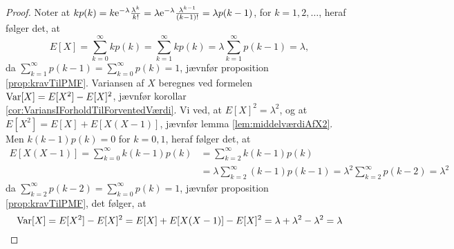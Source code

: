 \begin{proof}
Noter at $kp(k) = k \mathrm{e}^{-\lambda} \frac{\lambda^k}{k!} = \lambda \mathrm{e}^{-\lambda} \frac{\lambda^{k - 1}}{(k - 1)!} = \lambda p(k - 1)$, for $k = 1, 2, \ldots$, heraf følger det, at 
\begin{equation*}
    E[X] = \sum^\infty_{k = 0} k p(k) = \sum^\infty_{k = 1} k p(k) = \lambda \sum^\infty_{k = 1} p(k - 1) = \lambda,
\end{equation*}
da $\sum^\infty_{k = 1} p(k - 1) = \sum^\infty_{k = 0} p(k) =  1$, jævnfør proposition \ref{prop:kravTilPMF}.
Variansen af $X$ beregnes ved formelen $\textnormal{Var}[X] = E[X^2] - E[X]^2$, jævnfør korollar \ref{cor:VariansIForholdTilForventedVærdi}. Vi ved, at $E[X]^2 = \lambda^2$, og at $E[X^2] = E[X] + E[X(X - 1)]$, jævnfør lemma \ref{lem:middelværdiAfX2}. Men $k(k - 1)p(k) = 0$ for $k = 0, 1$, heraf følger det, at
\begin{align*}
    E[X(X-1)] = \sum^{\infty}_{k = 0} k (k - 1) p(k)
    &= \sum^\infty_{k = 2} k(k - 1) p(k) \\ &=  \lambda\sum^\infty_{k = 2} (k - 1) p(k - 1) =\lambda^2 \sum^\infty_{k = 2} p(k - 2) = \lambda^2
\end{align*}
da $\sum^\infty_{k = 2} p(k - 2) = \sum^\infty_{k = 0} p(k) = 1$, jævnfør proposition \ref{prop:kravTilPMF}, det følger, at 
\begin{equation*}
    \textnormal{Var}[X] = E[X^2] - E[X]^2 = E[X] + E[X(X - 1)] - E[X]^2 = \lambda + \lambda^2 - \lambda^2 = \lambda
\end{equation*}
\end{proof}
